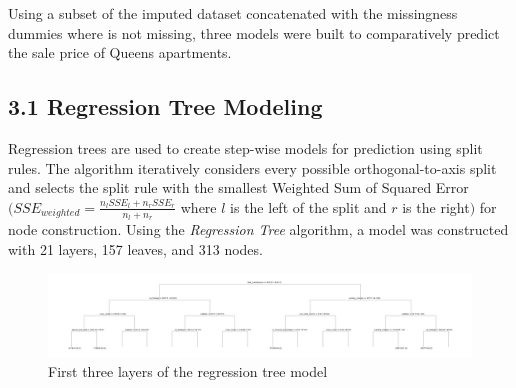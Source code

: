 \documentclass[12pt]{article}
\begin{document}
Using a subset of the imputed dataset concatenated with the missingness dummies where  is not missing, three models were built to comparatively predict the sale price of Queens apartments.

\subsection*{3.1 Regression Tree Modeling}


Regression trees are used to create step-wise models for prediction using split rules. The algorithm iteratively considers every possible orthogonal-to-axis split and selects the split rule with the smallest Weighted Sum of Squared Error $\big( SSE_{weighted} = \frac{n_l SSE_l + n_r SSE_r}{n_l + n_r}$ where $l$ is the left of the split and $r$ is the right$\big)$ for node construction. Using the \emph{Regression Tree} algorithm, a model was constructed with 21 layers, 157 leaves, and 313 nodes. 

\begin{figure} 
\centering
\includegraphics[scale = .5]{yarf_mod_tree_1.png} 
\caption{First three layers of the regression tree model}
\label{regression tree}
\end{figure} 
\end{document}
